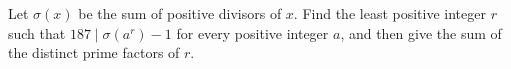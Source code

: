 Let $\sigma(x)$ be the sum of positive divisors of $x$. Find the least positive integer $r$ such that $187\mid\sigma(a^r)-1$ for every positive integer $a$, and then give the sum of the distinct prime factors of $r$.

